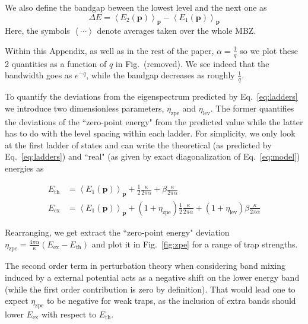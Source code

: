 \documentclass[twocolumn, 10pt, aps, superscriptaddress, floatfix, showpacs, pra, citeautoscript]{revtex4-1}
\newcommand{\vt}[1]{\mathbf{#1}}
\newcommand{\co}[2]{#2}
\renewcommand{\paragraph}{\co}
\begin{document}
\paragraph{The scaling of bandwidth and bandgap with q is different.}
We also define the bandgap beween the lowest level and the next one as
\begin{equation}
  \Delta E = \left<E_2(\vt{p})\right>_{\vt{p}} - \left<E_1(\vt{p})\right>_{\vt{p}}
\end{equation}
Here, the symbols $\left<\cdots\right>$ denote averages taken over the
whole MBZ.

Within this Appendix, as well as in the rest of the paper,
$\alpha=\frac{1}{q}$ so we plot these 2 quantities as a function of
$q$ in Fig.~(removed). We see indeed that the bandwidth
goes as $e^{-q}$, while the bandgap decreases as roughly
$\frac{1}{q}$.

To quantify the deviations from the eigenspectrum predicted by
Eq.~\eqref{eq:ladders} we introduce two dimensionless parameters,
$\eta_{\text{zpe}}$ and $\eta_{\text{lev}}$. The former quantifies the
deviations of the ``zero-point energy" from the predicted value while the
latter has to do with the level spacing within each ladder. For
simplicity, we only look at the first ladder of states and can write
the theoretical (as predicted by Eq.~\eqref{eq:ladders}) and ``real"
(as given by exact diagonalization of Eq.~\eqref{eq:model}) energies as

\begin{subequations}
  \begin{align}
    E_{\text{th}} &= \left<E_1(\vt{p})\right>_{\vt{p}} + \frac{1}{2}\frac{\kappa}{2\pi\alpha} + \beta \frac{\kappa}{2\pi\alpha}\\
    E_{\text{ex}} &= \left<E_1(\vt{p})\right>_{\vt{p}} +
          (1+\eta_{\text{zpe}})\frac{1}{2}\frac{\kappa}{2\pi\alpha} +
          (1+\eta_{\text{lev}})\beta \frac{\kappa}{2\pi\alpha}
  \end{align}   
\end{subequations}


Rearranging, we get extract the ``zero-point energy" deviation
$\eta_{\text{zpe}} = \frac{4\pi\alpha}{\kappa} (E_{\text{ex}} - E_{\text{th}})$ and plot
it in Fig.~\ref{fig:zpe} for a range of trap strengths.

\paragraph{There is a positive contribution to the zero point energy error.}  
The second order term in perturbation theory when considering band
mixing induced by a external potential acts as a negative shift on the
lower energy band (while the first order contribution is zero by
definition). That would lead one to expect $\eta_{\text{zpe}}$ to be
negative for weak traps, as the inclusion of extra bands should lower
$E_{\text{ex}}$ with respect to $E_{\text{th}}$.
\end{document}
